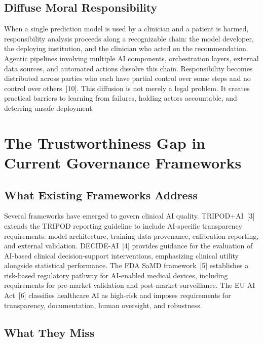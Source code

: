 \subsection{Diffuse Moral
Responsibility}\label{diffuse-moral-responsibility}

When a single prediction model is used by a clinician and a patient is
harmed, responsibility analysis proceeds along a recognizable chain: the
model developer, the deploying institution, and the clinician who acted
on the recommendation. Agentic pipelines involving multiple AI
components, orchestration layers, external data sources, and automated
actions dissolve this chain. Responsibility becomes distributed across
parties who each have partial control over some steps and no control
over others~{[}10{]}. This diffusion is not merely a legal problem. It
creates practical barriers to learning from failures, holding actors
accountable, and deterring unsafe deployment.


\section{The Trustworthiness Gap in Current Governance
Frameworks}\label{the-trustworthiness-gap-in-current-governance-frameworks}

\subsection{What Existing Frameworks
Address}\label{what-existing-frameworks-address}

Several frameworks have emerged to govern clinical AI quality. TRIPOD+AI~{[}3{]}
extends the TRIPOD reporting guideline to include AI-specific
transparency requirements: model architecture, training data provenance,
calibration reporting, and external validation. DECIDE-AI~{[}4{]}
provides guidance for the evaluation of AI-based clinical
decision-support interventions, emphasizing clinical utility alongside
statistical performance. The FDA SaMD framework~{[}5{]} establishes a
risk-based regulatory pathway for AI-enabled medical devices, including
requirements for pre-market validation and post-market surveillance. The
EU AI Act~{[}6{]} classifies healthcare AI as high-risk and imposes
requirements for transparency, documentation, human oversight, and
robustness.

\subsection{What They Miss}\label{what-they-miss}

